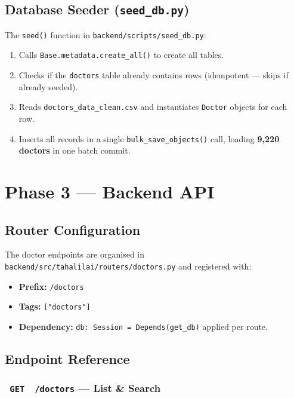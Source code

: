 \documentclass[12pt, a4paper]{article}
\newcommand{\file}[1]{\texttt{\color{accent}#1}}
\newcommand{\func}[1]{\texttt{\color{danger}#1}}
\newcommand{\badge}[2]{\colorbox{#1}{\color{white}\small\textbf{\ #2\ }}}
\newcommand{\endpoint}[2]{\texttt{\badge{apicolor}{#1}\ \color{primary}#2}}
\begin{document}
\subsection{Database Seeder (\file{seed\_db.py})}

The \func{seed()} function in \file{backend/scripts/seed\_db.py}:

\begin{enumerate}[leftmargin=*, itemsep=3pt]
  \item Calls \texttt{Base.metadata.create\_all()} to create all tables.
  \item Checks if the \texttt{doctors} table already contains rows
        (idempotent — skips if already seeded).
  \item Reads \file{doctors\_data\_clean.csv} and instantiates
        \texttt{Doctor} objects for each row.
  \item Inserts all records in a single \texttt{bulk\_save\_objects()} call,
        loading \textbf{9,220 doctors} in one batch commit.
\end{enumerate}

\section{Phase 3 — Backend API}

\subsection{Router Configuration}

The doctor endpoints are organised in
\file{backend/src/tahalilai/routers/doctors.py} and registered with:

\begin{itemize}[leftmargin=*]
  \item \textbf{Prefix:} \texttt{/doctors}
  \item \textbf{Tags:} \texttt{["doctors"]}
  \item \textbf{Dependency:} \texttt{db: Session = Depends(get\_db)}
        applied per route.
\end{itemize}

\subsection{Endpoint Reference}

\subsubsection{\endpoint{GET}{/doctors} — List \& Search}
\end{document}
